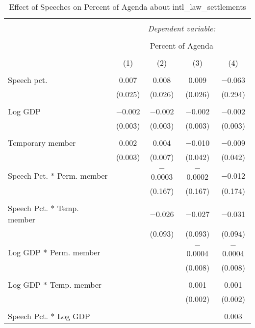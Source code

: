 
\begin{table}[!htbp] \centering 
  \caption{Effect of Speeches on Percent of Agenda about  intl_law_settlements} 
  \label{} 
\begin{tabular}{@{\extracolsep{5pt}}lcccc} 
\\[-1.8ex]\hline 
\hline \\[-1.8ex] 
 & \multicolumn{4}{c}{\textit{Dependent variable:}} \\ 
\cline{2-5} 
\\[-1.8ex] & \multicolumn{4}{c}{Percent of Agenda} \\ 
\\[-1.8ex] & (1) & (2) & (3) & (4)\\ 
\hline \\[-1.8ex] 
 Speech pct. & 0.007 & 0.008 & 0.009 & $-$0.063 \\ 
  & (0.025) & (0.026) & (0.026) & (0.294) \\ 
  & & & & \\ 
 Log GDP & $-$0.002 & $-$0.002 & $-$0.002 & $-$0.002 \\ 
  & (0.003) & (0.003) & (0.003) & (0.003) \\ 
  & & & & \\ 
 Temporary member & 0.002 & 0.004 & $-$0.010 & $-$0.009 \\ 
  & (0.003) & (0.007) & (0.042) & (0.042) \\ 
  & & & & \\ 
 Speech Pct. * Perm. member &  & $-$0.0003 & $-$0.0002 & $-$0.012 \\ 
  &  & (0.167) & (0.167) & (0.174) \\ 
  & & & & \\ 
 Speech Pct. * Temp. member &  & $-$0.026 & $-$0.027 & $-$0.031 \\ 
  &  & (0.093) & (0.093) & (0.094) \\ 
  & & & & \\ 
 Log GDP * Perm. member &  &  & $-$0.0004 & $-$0.0004 \\ 
  &  &  & (0.008) & (0.008) \\ 
  & & & & \\ 
 Log GDP * Temp. member &  &  & 0.001 & 0.001 \\ 
  &  &  & (0.002) & (0.002) \\ 
  & & & & \\ 
 Speech Pct. * Log GDP &  &  &  & 0.003 \\ 

\end{tabular}
\end{table}
